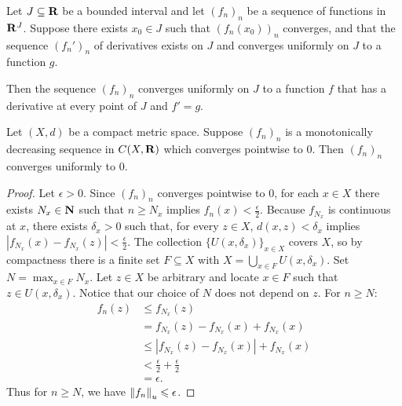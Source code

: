 \documentclass[11pt,twoside,openany]{memoir}
\begin{document}
    \begin{theorem}
        Let $J \subseteq \mathbf{R}$ be a bounded interval and let $(f_n)_n$ be a sequence of functions in $\mathbf{R}^J$. Suppose there exists $x_0 \in J$ such that $(f_n(x_0))_n$ converges, and that the sequence $(f_n')_n$ of derivatives exists on $J$ and converges uniformly on $J$ to a function $g$.

        Then the sequence $(f_n)_n$ converges uniformly on $J$ to a function $f$ that has a derivative at every point of $J$ and $f' = g$.
    \end{theorem}

    \begin{lemma}\label{lemma:dini}
        Let $(X,d)$ be a compact metric space. Suppose $(f_n)_n$ is a monotonically decreasing sequence in $C(X,\mathbf{R})$ which converges pointwise to $0$. Then $(f_n)_n$ converges uniformly to $0$.
    \end{lemma}
        \begin{proof}
            Let $\epsilon > 0$. Since $(f_n)_n$ converges pointwise to $0$, for each $x \in X$ there exists $N_x \in \mathbf{N}$ such that $n \geq N_x$ implies $f_n(x) < \frac{\epsilon}{2}$. Because $f_{N_x}$ is continuous at $x$, there exists $\delta_x > 0$ such that, for every $z \in X$, $d(x,z) < \delta_x$ implies $|f_{N_x}(x) - f_{N_x}(z)| < \frac{\epsilon}{2}$. The collection $\{U(x,\delta_x)\}_{x \in X}$ covers $X$, so by compactness there is a finite set $F \subseteq X$ with $X = \bigcup_{x \in F} U(x,\delta_x)$. Set $N = \max_{x \in F} N_x$. Let $z \in X$ be arbitrary and locate $x \in F$ such that $z \in U(x,\delta_x)$. Notice that our choice of $N$ does not depend on $z$. For $n \geq N$:
                \begin{equation*}
                \begin{split}
                    f_n(z) 
                    & \leq f_{N_x}(z) \\
                    & = f_{N_x}(z) - f_{N_x}(x) + f_{N_x}(x) \\
                    & \leq |f_{N_x}(z) - f_{N_x}(x)| + f_{N_x}(x) \\
                    & < \frac{\epsilon}{2} + \frac{\epsilon}{2} \\
                    & = \epsilon.
                \end{split}
                \end{equation*}
            Thus for $n \geq N$, we have $\left\lVert f_n \right\rVert_u \leqslant \epsilon$.
        \end{proof}
\end{document}
